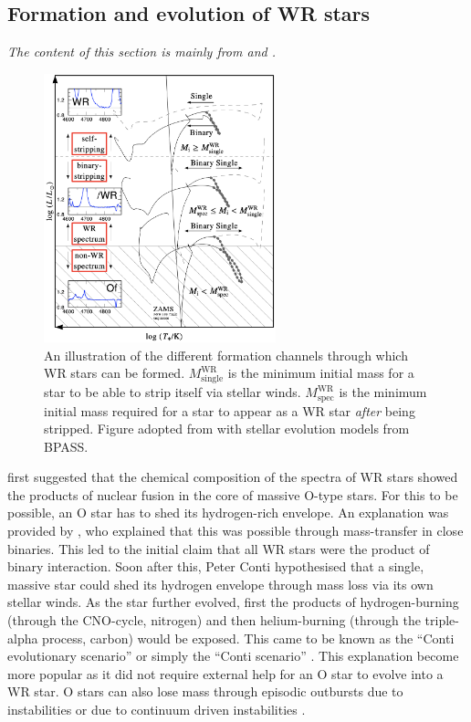 \subsection{Formation and evolution of WR stars}

\textit{The content of this section is mainly from \citet{crowther_physical_2007} and \citet{shenar_why_2020}.}

\begin{figure}
    \centering
    \includegraphics[width=0.6\textwidth]{chapters/introduction/image/FormationChannels.png}
    \caption{An illustration of the different formation channels through which WR stars can be formed. $M^{\textrm{WR}}_{\textrm{single}}$ is the minimum initial mass for a star to be able to strip itself via stellar winds. $M^{\textrm{WR}}_{\textrm{spec}}$ is the minimum initial mass required for a star to appear as a WR star \textit{after} being stripped. Figure adopted from \citet{shenar_why_2020} with stellar evolution models from BPASS.}
    \label{fig:formation_wr}
\end{figure}

\citet{gamow_wc_1943} first suggested that the chemical composition of the spectra of WR stars showed the products of nuclear fusion in the core of massive O-type stars. For this to be possible, an O star has to shed its hydrogen-rich envelope. An explanation was provided by \citet{paczynski_evolution_1967}, who explained that this was possible through mass-transfer in close binaries. This led to the initial claim that all WR stars were the product of binary interaction. Soon after this, Peter Conti hypothesised that a single, massive star could shed its hydrogen envelope through mass loss via its own stellar winds. As the star further evolved, first the products of hydrogen-burning (through the CNO-cycle, nitrogen) and then helium-burning (through the triple-alpha process, carbon) would be exposed. This came to be known as the ``Conti evolutionary scenario'' or simply the ``Conti scenario'' \citep{1976Conti}. This explanation become more popular as it did not require external help for an O star to evolve into a WR star. O stars can also lose mass through episodic outbursts due to instabilities \citep[e.g.][]{langer_towards_1994} or due to continuum driven instabilities \citep{smith_role_2006}.


